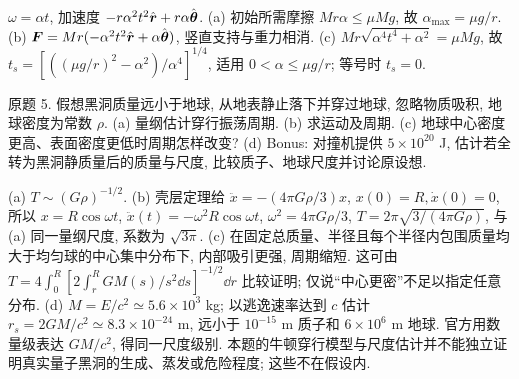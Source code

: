 \begin{solution}
$\omega=\alpha t$, 加速度 $-r\alpha^2t^2\hat{\boldsymbol{r}}+r\alpha\hat{\boldsymbol{\theta}}$. (a) 初始所需摩擦 $Mr\alpha\le\mu Mg$, 故 $\alpha_{\max}=\mu g/r$. (b) $\boldsymbol{F}=Mr(-\alpha^2t^2\hat{\boldsymbol{r}}+\alpha\hat{\boldsymbol{\theta}})$, 竖直支持与重力相消. (c) $Mr\sqrt{\alpha^4t^4+\alpha^2}=\mu Mg$, 故 $t_s=[((\mu g/r)^2-\alpha^2)/\alpha^4]^{1/4}$, 适用 $0<\alpha\le\mu g/r$; 等号时 $t_s=0$.
\end{solution}
\begin{exercise}
原题 5. 假想黑洞质量远小于地球, 从地表静止落下并穿过地球, 忽略物质吸积, 地球密度为常数 $\rho$. (a) 量纲估计穿行振荡周期. (b) 求运动及周期. (c) 地球中心密度更高、表面密度更低时周期怎样改变? (d) Bonus: 对撞机提供 $5\times10^{20}$ J, 估计若全转为黑洞静质量后的质量与尺度, 比较质子、地球尺度并讨论原设想.
\end{exercise}
\begin{solution}
(a) $T\sim(G\rho)^{-1/2}$. (b) 壳层定理给 $\ddot x=-(4\pi G\rho/3)x$, $x(0)=R,\dot x(0)=0$, 所以 $x=R\cos\omega t$, $\ddot x(t)=-\omega^2R\cos\omega t$, $\omega^2=4\pi G\rho/3$, $T=2\pi\sqrt{3/(4\pi G\rho)}$, 与 (a) 同一量纲尺度, 系数为 $\sqrt{3\pi}$. (c) 在固定总质量、半径且每个半径内包围质量均大于均匀球的中心集中分布下, 内部吸引更强, 周期缩短. 这可由 $T=4\int_0^R[2\int_r^RGM(s)/s^2\dd s]^{-1/2}\dd r$ 比较证明; 仅说“中心更密”不足以指定任意分布. (d) $M=E/c^2\simeq5.6\times10^3$ kg; 以逃逸速率达到 $c$ 估计 $r_s=2GM/c^2\simeq8.3\times10^{-24}$ m, 远小于 $10^{-15}$ m 质子和 $6\times10^6$ m 地球. 官方用数量级表达 $GM/c^2$, 得同一尺度级别. 本题的牛顿穿行模型与尺度估计并不能独立证明真实量子黑洞的生成、蒸发或危险程度; 这些不在假设内.
\end{solution}

